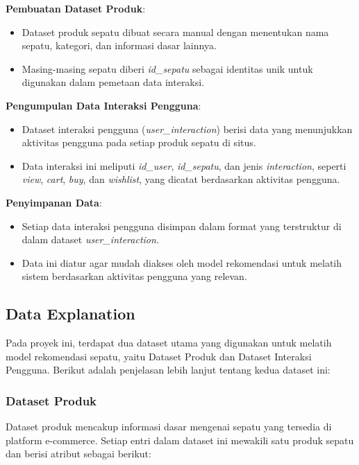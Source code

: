 \documentclass[journal,article,submit,pdftex,moreauthors]{Definitions/mdpi}
\begin{document}
    \item \textbf{Pembuatan Dataset Produk}:
    \begin{itemize}
        \item Dataset produk sepatu dibuat secara manual dengan menentukan nama sepatu, kategori, dan informasi dasar lainnya.
        \item Masing-masing sepatu diberi \textit{id\_sepatu} sebagai identitas unik untuk digunakan dalam pemetaan data interaksi.
    \end{itemize}
    
    \item \textbf{Pengumpulan Data Interaksi Pengguna}:
    \begin{itemize}
        \item Dataset interaksi pengguna (\textit{user\_interaction}) berisi data yang menunjukkan aktivitas pengguna pada setiap produk sepatu di situs.
        \item Data interaksi ini meliputi \textit{id\_user}, \textit{id\_sepatu}, dan jenis \textit{interaction}, seperti \textit{view}, \textit{cart}, \textit{buy}, dan \textit{wishlist}, yang dicatat berdasarkan aktivitas pengguna.
    \end{itemize}
    
    \item \textbf{Penyimpanan Data}:
    \begin{itemize}
        \item Setiap data interaksi pengguna disimpan dalam format yang terstruktur di dalam dataset \textit{user\_interaction}.
        \item Data ini diatur agar mudah diakses oleh model rekomendasi untuk melatih sistem berdasarkan aktivitas pengguna yang relevan.
    \end{itemize}



\subsection{Data Explanation}
Pada proyek ini, terdapat dua dataset utama yang digunakan untuk melatih model rekomendasi sepatu, yaitu Dataset Produk dan Dataset Interaksi Pengguna. Berikut adalah penjelasan lebih lanjut tentang kedua dataset ini:

\subsubsection{Dataset Produk}
Dataset produk mencakup informasi dasar mengenai sepatu yang tersedia di platform e-commerce. Setiap entri dalam dataset ini mewakili satu produk sepatu dan berisi atribut sebagai berikut:
\end{document}
